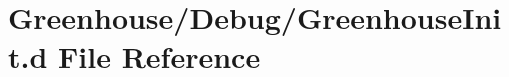\hypertarget{_greenhouse_init_8d}{}\section{Greenhouse/\+Debug/\+Greenhouse\+Init.d File Reference}
\label{_greenhouse_init_8d}
